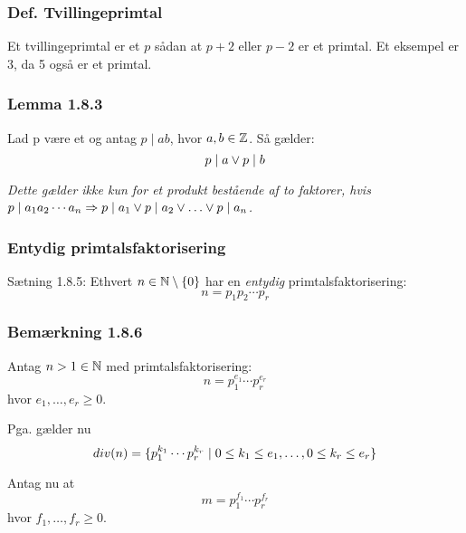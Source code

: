 \subsubsection{Def. Tvillingeprimtal}
Et tvillingeprimtal er et  $p$ sådan at $p + 2$ eller $p - 2$
er et primtal. Et eksempel er 3, da 5 også er et primtal.

\subsubsection{Lemma 1.8.3}
\label{Lemma 1.8.3}
Lad p være et  og antag $p \mid ab$, hvor $a,b\in\mathbb{Z}$. Så
gælder:
\begin{equation*}
  p \mid a \vee p \mid b
\end{equation*}

\textit{Dette gælder ikke kun for et produkt bestående af to faktorer, hvis
$p \mid a_1 a_2 \cdots a_n \Rightarrow p \mid a_1 \vee p \mid a_2 \vee \ldots
\vee p \mid a_n$.}

\subsubsection{Entydig primtalsfaktorisering}
\label{Entydig primtalsfaktorisering}
Sætning 1.8.5: Ethvert $n \in \mathbb{N}\setminus \{0\}$ har en \textit{entydig}
primtalsfaktorisering:
\begin{equation*}
  n = p_1 p_2 \cdots p_r
\end{equation*}

\subsubsection{Bemærkning 1.8.6}
Antag $n > 1 \in \mathbb{N}$ med primtalsfaktorisering:
\begin{equation*}
  n = p_{1}^{e_1} \cdots p_{r}^{e_r}
\end{equation*}
hvor $e_1, \ldots, e_r \geq 0$.

Pga.  gælder nu
\begin{equation*}
  div(n) = \{ p_1 ^ {k_1} \cdots p_r ^ {k_r} \mid 0 \leq k_1 \leq e_1,
  \ldots, 0 \leq k_r \leq e_r \}
\end{equation*}

Antag nu at
\begin{equation*}
  m = p_{1}^{f_1} \cdots p_{r}^{f_r}
\end{equation*}
hvor $f_1, \ldots, f_r \geq 0$.

